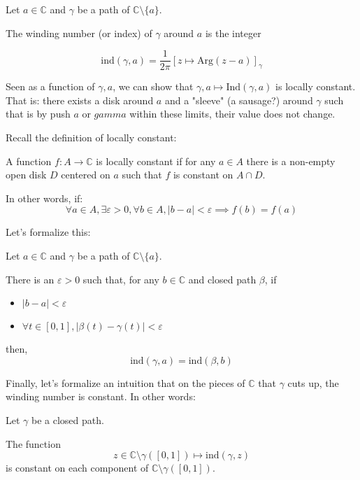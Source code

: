 \begin{defi}
    Let $a\in\mathbb{C}$ and $\gamma$ be a path of $\mathbb{C} \setminus \lbrace a \rbrace$.
    
    The winding number (or index) of $\gamma$ around $a$ is the integer

    $$ \mathrm{ind}(\gamma, a) = \frac{1}{2\pi}[z \mapsto \mathrm{Arg}(z-a)]_\gamma $$
\end{defi}

Seen as a function of $\gamma, a$, we can show that $\gamma, a \mapsto \mathrm{Ind}(\gamma, a)$ is locally constant. That is: there exists a disk around $a$ and a "sleeve" (a sausage?) around $\gamma$ such that is by push $a$ or $gamma$ within these limits, their value does not change.

Recall the definition of locally constant:

\begin{defi}
    A function $f: A \rightarrow \mathbb{C}$ is locally constant if for any $a\in A$ there is a non-empty open disk $D$ centered on $a$ such that $f$ is constant on $A\cap D$.

    In other words, if:
    $$ \forall a \in A, \exists \varepsilon >0, \forall b \in A, |b-a|< \varepsilon \implies f(b) = f(a) $$
\end{defi}

Let's formalize this:

\begin{thm*}
    Let $a\in\mathbb{C}$ and $\gamma$ be a path of $\mathbb{C} \setminus \lbrace a \rbrace$.
   
    There is an $\varepsilon > 0$ such that, for any $b\in \mathbb{C}$ and closed path $\beta$, if 
    \begin{itemize}
        \item $|b - a| < \varepsilon$
        \item $\forall t \in [0,1], |\beta(t) - \gamma(t)| < \varepsilon $
    \end{itemize}

    then, $$\mathrm{ind}(\gamma, a) = \mathrm{ind}(\beta, b)$$
\end{thm*}

Finally, let's formalize an intuition that on the pieces of $\mathbb{C}$ that $\gamma$ cuts up, the winding number is constant. In other words:

\begin{thm*}
    Let $\gamma$ be a closed path.

    The function
    $$ z \in \mathbb{C} \setminus \gamma([0,1]) \mapsto \mathrm{ind}(\gamma, z) $$
    is constant on each component of $\mathbb{C}\setminus \gamma([0,1])$.
\end{thm*}

